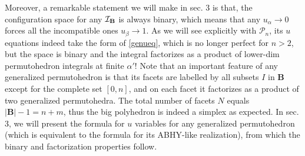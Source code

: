 \documentclass[hidelinks,12pt]{article}
\begin{document}
Moreover, a remarkable statement we will make in sec. 3 is that, the configuration space for any ${\cal I}_{\mathbf B}$ is always binary, which means that any $u_\alpha \to 0$ forces all the incompatible ones $u_\beta\to 1$. As we will see explicitly with ${\mathscr P}_n$, its $u$ equations indeed take the form of \eqref{genueq}, which is no longer perfect for $n>2$, but the space is binary and the integral factorizes as a product of lower-dim permutohedron integrals at finite $\alpha'$! Note that an important feature of any generalized permutohedron is that its facets are labelled by all subsets $I$ in ${\mathbf B}$ except for the complete set $[0,n]$, and on each facet it factorizes as a product of two generalized permutohedra. The total number of facets $N$ equals $|{\mathbf B}|-1=n+m$, thus the big polyhedron is indeed a simplex as expected. In sec. 3, we will present the formula for $u$ variables for any generalized permutohedron (which is equivalent to the formula for its ABHY-like realization), from which the binary and factorization properties follow.



\end{document}
